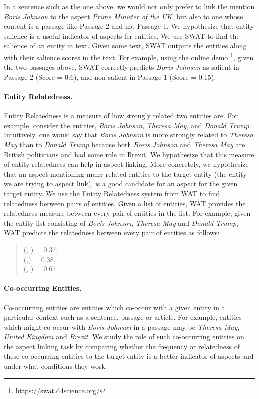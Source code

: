 In a sentence such as the one above, we would not only prefer to link the mention \textit{Boris Johnson} to the aspect \textit{Prime Minister of the UK}, but also to one whose content is a passage like Passage 2 and not Passage 1. We hypothesize that entity salience is a useful indicator of aspects for entities. We use SWAT \cite{swat}  to find the salience of an entity in text. Given some text, SWAT outputs the entities along with their salience scores in the text. For example, using the online demo \footnote{https://swat.d4science.org/}, given the two passages above, SWAT correctly predicts \textit{Boris Johnson} as salient in Passage 2 (Score = 0.6), and non-salient in Passage 1 (Score = 0.15). 

\paragraph{\textbf{Entity Relatedness. }}
Entity Relatedness is a measure of how strongly related two entities are. For example, consider the entities, \textit{Boris Johnson}, \textit{Theresa May}, and \textit{Donald Trump}. Intuitively, one would say that \textit{Boris Johnson} is more strongly related to \textit{Theresa May} than to \textit{Donald Trump} because both \textit{Boris Johnson} and \textit{Theresa May} are British politicians and had some role in Brexit. We hypothesize that this measure of entity relatedness can help in aspect linking. More concretely, we hypothesize that an aspect mentioning many related entities to the target entity (the entity we are trying to aspect link), is a good candidate for an aspect for the given target entity. 
We use the Entity Relatedness system from WAT \cite{piccinno2014wat} to find relatedness between pairs of entities. Given a list of entities, WAT provides the
relatedness measure between every pair of entities in the list. For example, given the entity list consisting of \textit{Boris Johnson}, \textit{Theresa May} and \textit{Donald Trump}, WAT predicts the relatedness between every pair of entities as follows:
\begin{quote}
    (, ) = 0.37, \\
    (,)    = 0.38, \\
    (, )  = 0.67
\end{quote}

\paragraph{\textbf{Co-occurring Entities.}}
Co-occurring entities are entities which co-occur with a given entity in a particular context such as a sentence, passage or article. For example, entities which might co-occur with \textit{Boris Johnson} in a passage may be \textit{Theresa May}, \textit{United Kingdom} and \textit{Brexit}. We study the role of such co-occurring entities on the aspect linking task by comparing whether the frequency or relatedness of these co-occurring entities to the target entity is a better indicator of aspects and under what conditions they work. 
